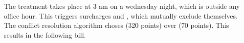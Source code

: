 The treatment takes place at 3 am on a wednesday night, which is outside any office hour.
This triggers surcharges  and , which mutually exclude themselves.
The conflict resolution algorithm choses  (320 points) over  (70 points).
This results in the following bill.



